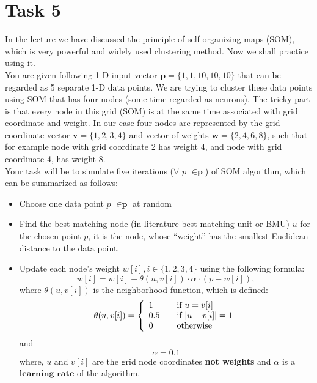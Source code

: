 \documentclass{article}
\begin{document}
\section*{Task 5}
In the lecture we have discussed the principle of self-organizing maps (SOM), which is very powerful and widely used clustering method. Now we shall practice using it.\\ You are given following 1-D input vector $\textbf{p} = \{1,1,10,10,10\}$ that can be regarded as 5 separate 1-D data points. We are trying to cluster these data points using SOM that has four nodes (some time regarded as neurons). The tricky part is that every node in this grid (SOM) is at the same time associated with grid coordinate and weight. In our case four nodes are represented by the grid coordinate vector $\textbf{v} = \{1,2,3,4\}$ and vector of weights  $\textbf{w} = \{2,4,6,8\}$, such that for example node with grid coordinate 2 has weight 4, and node with grid coordinate 4, has weight 8.\\
Your task will be to simulate five iterations ($\forall$ $p$ $\in\textbf{p}$) of SOM algorithm, which can be summarized as follows: 
\begin{itemize}
\item Choose one data point $p$ $\in\textbf{p}$ at random
\item Find the best matching node (in literature best matching unit or BMU) $u$  for the chosen point $p$, it is the node, whose ``weight'' has the smallest Euclidean distance to the data point.
\item Update each node's weight $w[i], i \in \{1,2,3,4\}$ using the following formula:
\begin{equation}
w[i] = w[i] + \theta(u, v[i])\cdot\alpha\cdot(p - w[i]),
\end{equation}
where  $\theta(u,v[i])$ is the neighborhood function, which is defined:
\[ \theta(u, v[i]) = \left\{ 
  \begin{array}{l l}
    1 & \quad \text{if $u = v[i]$}\\
    0.5 & \quad \text{if $|u - v[i]| = 1$}\\
    0 & \quad \text{otherwise}
 \end{array} \right.\]
and
$$
\alpha = 0.1
$$
where, $u$ and $v[i]$ are the grid node coordinates \textbf{not  weights} and $\alpha$ is a $\textbf{learning rate}$ of the algorithm.

\end{itemize}
\end{document}

